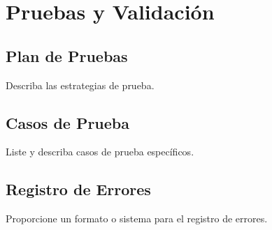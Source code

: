 	\chapter{Pruebas y Validación}
	\section{Plan de Pruebas}
	Describa las estrategias de prueba.
	
	\section{Casos de Prueba}
	Liste y describa casos de prueba específicos.
	
	\section{Registro de Errores}
	Proporcione un formato o sistema para el registro de errores.
	

